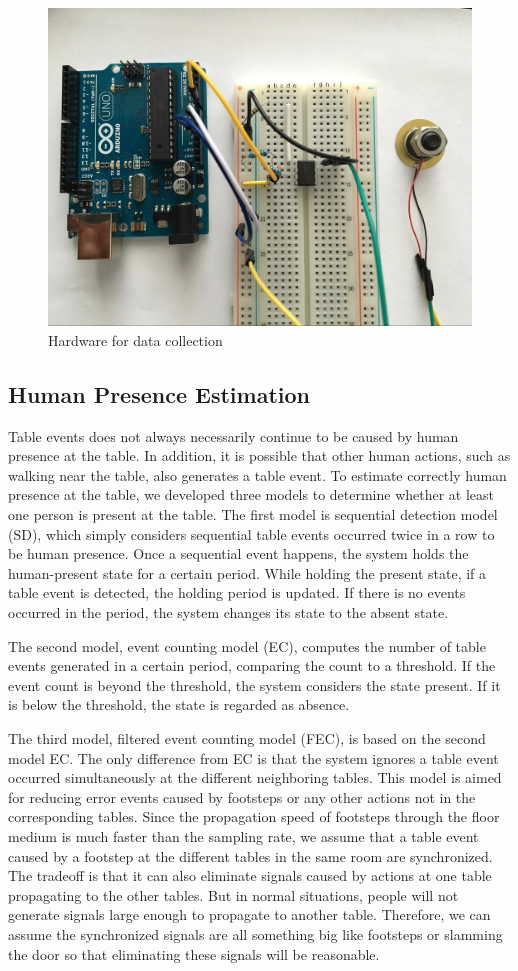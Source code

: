 \documentclass{sig-alternate-ipsn13}
\begin{document}
\begin{figure}
  \centering
  \includegraphics[width=0.8\linewidth]{figure/dataCollection.jpg}
  \caption{Hardware for data collection}
  \label{fig:DataCollection}
\end{figure}

\subsection{Human Presence Estimation}
Table events does not always necessarily continue to be caused by human presence at the table. In addition, it is possible that other human actions, such as walking near the table, also generates a table event. To estimate correctly human presence at the table, we developed three models to determine whether at least one person is present at the table. 
The first model is sequential detection model (SD), which simply considers sequential table events occurred twice in a row to be human presence. Once a sequential event happens, the system holds the human-present state for a certain period. While holding the present state, if a table event is detected, the holding period is updated. If there is no events occurred in the period, the system changes its state to the absent state. 

The second model, event counting model (EC), computes the number of table events generated in a certain period, comparing the count to a threshold. If the event count is beyond the threshold, the system considers the state present. If it is below the threshold, the state is regarded as absence.

The third model, filtered event counting model (FEC), is based on the second model EC. The only difference from EC is that the system ignores a table event occurred simultaneously at the different neighboring tables. This model is aimed for reducing error events caused by footsteps or any other actions not in the corresponding tables. Since the propagation speed of footsteps through the floor medium is much faster than the sampling rate, we assume that a table event caused by a footstep at the different tables in the same room are synchronized. The tradeoff is that it can also eliminate signals caused by actions at one table propagating to the other tables. But in normal situations, people will not generate signals large enough to propagate to another table. Therefore, we can assume the synchronized signals are all something big like footsteps or slamming the door so that eliminating these signals will be reasonable. 
\end{document}
